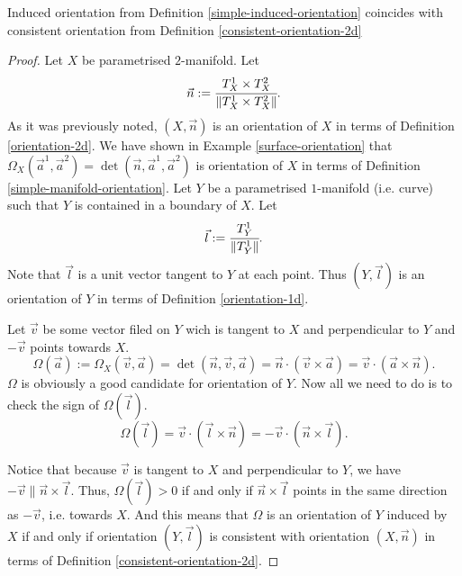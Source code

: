 \documentclass[main.tex]{subfiles}
\begin{document}
\begin{proposition}
Induced orientation from Definition \ref{simple-induced-orientation} coincides with consistent orientation from Definition \ref{consistent-orientation-2d}
\end{proposition}
\begin{proof}
Let $X$ be parametrised $2$-manifold. Let
\begin{equation}
\vec{n} := \cfrac{T^1_X\times T^2_X}{\norm{T^1_X\times T^2_X}}.
\end{equation}
As it was previously noted, $(X,\vec{n})$ is an orientation of $X$ in terms of Definition \ref{orientation-2d}.
We have shown in Example \ref{surface-orientation} that $\Omega_X(\vec{a}^1, \vec{a}^2) = \det(\vec{n}, \vec{a}^1, \vec{a}^2)$ is orientation of $X$ in terms of Definition \ref{simple-manifold-orientation}.
Let $Y$ be a parametrised $1$-manifold (i.e. curve) such that $Y$ is contained in a boundary of $X$. Let
\begin{equation}
\vec{l} := \cfrac{T_Y^1}{\norm{T_Y^1}}.
\end{equation}
Note that $\vec{l}$ is a unit vector tangent to $Y$ at each point. Thus $(Y, \vec{l})$ is an orientation of $Y$ in terms of Definition \ref{orientation-1d}.

Let $\vec{v}$ be some vector filed on $Y$ wich is tangent to $X$ and perpendicular to $Y$ and $-\vec{v}$ points towards $X$.   
\begin{equation}
\Omega(\vec{a}) := \Omega_X(\vec{v}, \vec{a}) = \det(\vec{n}, \vec{v}, \vec{a}) = \vec{n}\cdot (\vec{v}\times \vec{a}) = \vec{v}\cdot(\vec{a}\times \vec{n}).
\end{equation}
$\Omega$ is obviously a good candidate for orientation of $Y$. Now all we need to do is to check the sign of $\Omega(\vec{l})$.
\begin{equation}
\Omega(\vec{l}) = \vec{v}\cdot(\vec{l}\times \vec{n}) = -\vec{v}\cdot(\vec{n}\times\vec{l}).
\end{equation}

Notice that because $\vec{v}$ is tangent to $X$ and perpendicular to $Y$, we have $-\vec{v} \parallel \vec{n}\times \vec{l}$. Thus, $\Omega(\vec{l}) > 0$ if and only if $\vec{n}\times \vec{l}$ points in the same direction as $-\vec{v}$, i.e. towards $X$. And this means that $\Omega$ is an orientation of $Y$ induced by $X$ if and only if orientation $(Y,\vec{l})$ is consistent with orientation $(X, \vec{n})$ in terms of Definition \ref{consistent-orientation-2d}.
\end{proof}
\end{document}
